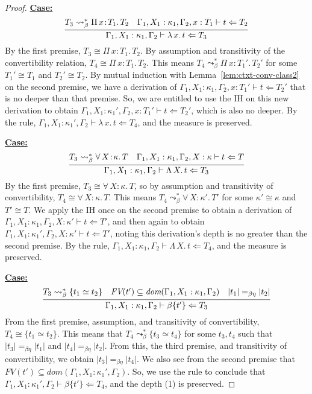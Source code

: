 \documentclass{article}
\newcommand{\abs}[4]{{#1}\, #2\! : \! #3.\, #4}
\newcommand{\absu}[3]{{#1}\, #2.\, #3}
\newcommand{\tpcheck}[0]{\Leftarrow}
\newcommand{\startcase}[1]{\vspace{#1} \noindent\textbf{\underline{Case:}}}
\begin{document}
\begin{proof}
  \startcase{.2cm}
  \[
    \infer{
      \Gamma_1,X_1:\kappa_1,\Gamma_2 \vdash \absu{\lambda}{x}{t} \tpcheck T_3
    }{
      T_3 \leadsto_\beta^* \abs{\Pi}{x}{T_1}{T_2}
      & \Gamma_1,X_1:\kappa_1,\Gamma_2,x:T_1\vdash t\tpcheck T_2
    }
  \]
  By the first premise, \(T_3 \cong \abs{\Pi}{x}{T_1}{T_2}\).
  By assumption and transitivity of the convertibility relation, \(T_4 \cong
  \abs{\Pi}{x}{T_1}{T_2}\).
  This means \(T_4 \leadsto_\beta^* \abs{\Pi}{x}{T_1'}{T_2'}\) for some \(T_1'
  \cong T_1\) and \(T_2' \cong T_2\).
  By mutual induction with Lemma~\ref{lem:ctxt-conv-class2} on the second
  premise, we have a derivation of \(\Gamma_1,X_1:\kappa_1,\Gamma_2,x:T_1'
  \vdash t \tpcheck T_2'\) that is no deeper than that premise.
  So, we are entitled to use the IH on this new derivation to obtain
  \(\Gamma_1,X_1:\kappa_1',\Gamma_2,x:T_1' \vdash t \tpcheck T_2'\), which is
  also no deeper.
  By the rule, \(\Gamma_1,X_1:\kappa_1',\Gamma_2 \vdash \absu{\lambda}{x}{t}
  \tpcheck T_4\), and the measure is preserved.
  
  \startcase{.2cm}
  \[
    \infer{
      \Gamma_1,X_1:\kappa_1,\Gamma_2\vdash \absu{\Lambda}{X}{t} \tpcheck T_3
    }{
      T_3 \leadsto_\beta^* \abs{\forall}{X}{\kappa}{T}
      & \Gamma_1,X_1:\kappa_1,\Gamma_2,X:\kappa\vdash t \tpcheck T
    }
  \]
  By the first premise, \(T_3 \cong \abs{\forall}{X}{\kappa}{T}\), so by
  assumption and transitivity of convertibility, \(T_4 \cong
  \abs{\forall}{X}{\kappa}{T}\).
  This means \(T_4 \leadsto_\beta^* \abs{\forall}{X}{\kappa'}{T'}\) for some
  \(\kappa' \cong \kappa\) and \(T' \cong T\).
  We apply the IH once on the second premise to obtain a derivation of
  \(\Gamma_1,X_1:\kappa_1,\Gamma_2,X:\kappa' \vdash t \tpcheck T'\), and then
  again to obtain \(\Gamma_1,X_1:\kappa_1',\Gamma_2,X:\kappa' \vdash t \tpcheck
  T'\), noting this derivation's depth is no greater than the second premise.
  By the rule, \(\Gamma_1,X_1:\kappa_1,\Gamma_2 \vdash \absu{\Lambda}{X}{t}
  \tpcheck T_4\), and the measure is preserved.

  \startcase{.2cm}
  \[
    \infer{
      \Gamma_1,X_1:\kappa_1,\Gamma_2 \vdash \beta\{t'\} \tpcheck T_3
    }{
      T_3 \leadsto_\beta^* \{t_1 \simeq t_2\}
      & \textit{FV}(t')\subseteq \textit{dom}(\Gamma_1,X_1:\kappa_1,\Gamma_2)
      & |t_1| =_{\beta\eta} |t_2|
    }
  \]
  From the first premise, assumption, and transitivity of convertibility, \(T_4
  \cong \{t_1 \simeq t_2\}\).
  This means that \(T_4 \leadsto_\beta^* \{t_3 \simeq t_4\}\) for some
  \(t_3,t_4\) such that \(|t_3| =_{\beta\eta} |t_1|\) and \(|t_4| =_{\beta\eta}
  |t_2|\).
  From this, the third premise, and transitivity of convertibility, we obtain
  \(|t_3| =_{\beta\eta} |t_4|\).
  We also see from the second premise that \(\textit{FV}(t') \subseteq
  \textit{dom}(\Gamma_1,X_1:\kappa_1',\Gamma_2)\).
  So, we use the rule to conclude that \(\Gamma_1,X_1:\kappa_1',\Gamma_2 \vdash
  \beta\{t'\} \tpcheck T_4\), and the depth (1) is preserved.


\end{proof}
\end{document}
